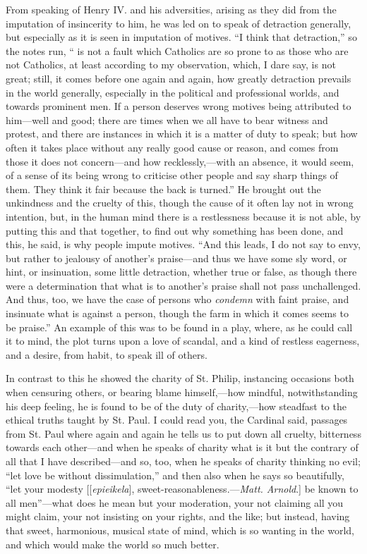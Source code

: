 From speaking of Henry IV. and his adversities, arising as they did
from the imputation of insincerity to him, he was led on to speak of
detraction generally, but especially as it is seen in imputation of
motives. ``I think that detraction,'' so the notes run, ``
is not a fault which Catholics are so prone to as those who are not
Catholics, at least according to my observation, which, I dare say, is
not great; still, it comes before one again and again, how greatly
detraction prevails in the world generally, especially in the
political and professional worlds, and towards prominent men. If a
person deserves wrong motives being attributed to him—well and good;
there are times when we all have to bear witness and protest, and
there are instances in which it is a matter of duty to speak; but how
often it takes place without any really good cause or reason, and
comes from those it does not concern—and how recklessly,—with an
absence, it would seem, of a sense of its being wrong to criticise
other people and say sharp things of them. They think it fair because
the back is turned.'' He brought out the unkindness and the
cruelty of this, though the cause of it often lay not in wrong
intention, but, in the human mind there is a restlessness because it
is not able, by putting this and that together, to find out why
something has been done, and this, he said, is why people impute
motives. ``And this leads, I do not say to envy, but rather to
jealousy of another’s praise—and thus we have some sly word, or
hint, or insinuation, some little detraction, whether true or false,
as though there were a determination that what is to another’s
praise shall not pass unchallenged. And thus, too, we have the case of
persons who \emph{condemn} with faint praise, and insinuate what is
against a person, though the farm in which it comes seems to be
praise.'' An example of this was to be found
in a play, where, as he could call it to mind, the plot turns upon a
love of scandal, and a kind of restless eagerness, and a desire, from
habit, to speak ill of others.

In contrast to this he showed the charity of St. Philip, instancing
occasions both when censuring others, or bearing blame himself,—how
mindful, notwithstanding his deep feeling, he is found to be of the
duty of charity,—how steadfast to the ethical truths taught by St.
Paul. I could read you, the Cardinal said, passages from St. Paul
where again and again he tells us to put down all cruelty, bitterness
towards each other—and when he speaks of charity what is it but the
contrary of all that I have described—and so, too, when he speaks of
charity thinking no evil; ``let love be without
dissimulation,'' and then also when he says so beautifully,
``let your modesty [[\emph{epieikela}], sweet-reasonableness.—\emph{Matt.
Arnold}.] be known to all men''—what does he mean but your
moderation, your not claiming all you might claim, your not insisting
on your rights, and the like; but instead, having that sweet,
harmonious, musical state of mind, which is so wanting in the world,
and which would make the world so much better.

